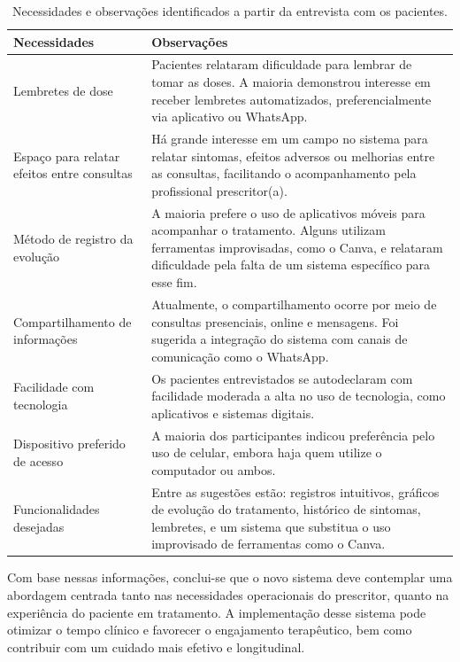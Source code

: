 \href{}{}\documentclass[12pt,portuguese,oneside]{article}
\begin{document}
\begin{table}[H]
\centering
\caption{Necessidades e observações identificados a partir da entrevista com os pacientes.}
\begin{tabularx}{\textwidth}{|>{\raggedright\arraybackslash}p{4.2cm}|>{\raggedright\arraybackslash}X|}
\hline
\rowcolor{gray!20}
\textbf{Necessidades} & \textbf{Observações} \\
\hline
Lembretes de dose & Pacientes relataram dificuldade para lembrar de tomar as doses. A maioria demonstrou interesse em receber lembretes automatizados, preferencialmente via aplicativo ou WhatsApp. \\
\hline
Espaço para relatar efeitos entre consultas & Há grande interesse em um campo no sistema para relatar sintomas, efeitos adversos ou melhorias entre as consultas, facilitando o acompanhamento pela profissional prescritor(a). \\
\hline
Método de registro da evolução & A maioria prefere o uso de aplicativos móveis para acompanhar o tratamento. Alguns utilizam ferramentas improvisadas, como o Canva, e relataram dificuldade pela falta de um sistema específico para esse fim. \\
\hline
Compartilhamento de informações & Atualmente, o compartilhamento ocorre por meio de consultas presenciais, online e mensagens. Foi sugerida a integração do sistema com canais de comunicação como o WhatsApp. \\
\hline
Facilidade com tecnologia & Os pacientes entrevistados se autodeclaram com facilidade moderada a alta no uso de tecnologia, como aplicativos e sistemas digitais. \\
\hline
Dispositivo preferido de acesso & A maioria dos participantes indicou preferência pelo uso de celular, embora haja quem utilize o computador ou ambos. \\
\hline
Funcionalidades desejadas & Entre as sugestões estão: registros intuitivos, gráficos de evolução do tratamento, histórico de sintomas, lembretes, e um sistema que substitua o uso improvisado de ferramentas como o Canva. \\
\hline
\end{tabularx}
\end{table}


Com base nessas informações, conclui-se que o novo sistema deve contemplar uma abordagem centrada tanto nas necessidades operacionais do prescritor, quanto na experiência do paciente em tratamento. A implementação desse sistema pode otimizar o tempo clínico e favorecer o engajamento terapêutico, bem como contribuir com um cuidado mais efetivo e longitudinal.
\end{document}
